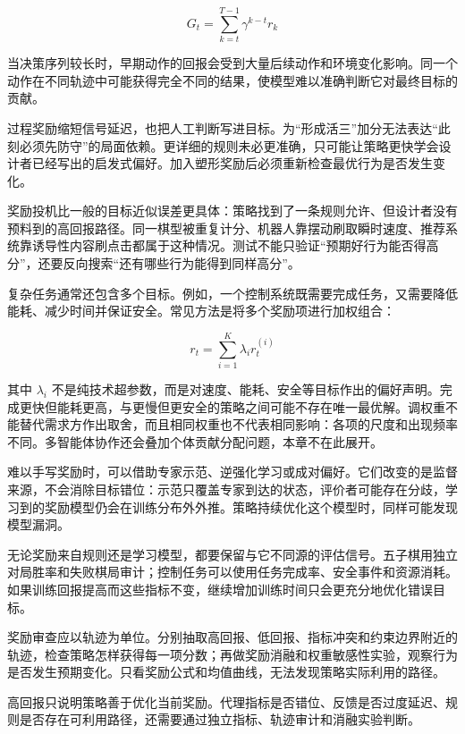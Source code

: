 \documentclass[UTF8,a4paper,zihao=-4,oneside,openany]{ctexbook}
\begin{document}
\begin{equation}
G_t
=
\sum_{k=t}^{T-1}
\gamma^{k-t}r_k
\end{equation}

当决策序列较长时，早期动作的回报会受到大量后续动作和环境变化影响。同一个动作在不同轨迹中可能获得完全不同的结果，使模型难以准确判断它对最终目标的贡献。


过程奖励缩短信号延迟，也把人工判断写进目标。为“形成活三”加分无法表达“此刻必须先防守”的局面依赖。更详细的规则未必更准确，只可能让策略更快学会设计者已经写出的启发式偏好。加入塑形奖励后必须重新检查最优行为是否发生变化。

奖励投机比一般的目标近似误差更具体：策略找到了一条规则允许、但设计者没有预料到的高回报路径。同一棋型被重复计分、机器人靠摆动刷取瞬时速度、推荐系统靠诱导性内容刷点击都属于这种情况。测试不能只验证“预期好行为能否得高分”，还要反向搜索“还有哪些行为能得到同样高分”。

复杂任务通常还包含多个目标。例如，一个控制系统既需要完成任务，又需要降低能耗、减少时间并保证安全。常见方法是将多个奖励项进行加权组合：

\begin{equation}
r_t
=
\sum_{i=1}^{K}
\lambda_i r_t^{(i)}
\end{equation}

其中 $\lambda_i$ 不是纯技术超参数，而是对速度、能耗、安全等目标作出的偏好声明。完成更快但能耗更高，与更慢但更安全的策略之间可能不存在唯一最优解。调权重不能替代需求方作出取舍，而且相同权重也不代表相同影响：各项的尺度和出现频率不同。多智能体协作还会叠加个体贡献分配问题，本章不在此展开。

难以手写奖励时，可以借助专家示范、逆强化学习或成对偏好。它们改变的是监督来源，不会消除目标错位：示范只覆盖专家到达的状态，评价者可能存在分歧，学习到的奖励模型仍会在训练分布外外推。策略持续优化这个模型时，同样可能发现模型漏洞。

无论奖励来自规则还是学习模型，都要保留与它不同源的评估信号。五子棋用独立对局胜率和失败棋局审计；控制任务可以使用任务完成率、安全事件和资源消耗。如果训练回报提高而这些指标不变，继续增加训练时间只会更充分地优化错误目标。

奖励审查应以轨迹为单位。分别抽取高回报、低回报、指标冲突和约束边界附近的轨迹，检查策略怎样获得每一项分数；再做奖励消融和权重敏感性实验，观察行为是否发生预期变化。只看奖励公式和均值曲线，无法发现策略实际利用的路径。

高回报只说明策略善于优化当前奖励。代理指标是否错位、反馈是否过度延迟、规则是否存在可利用路径，还需要通过独立指标、轨迹审计和消融实验判断。
\end{document}
